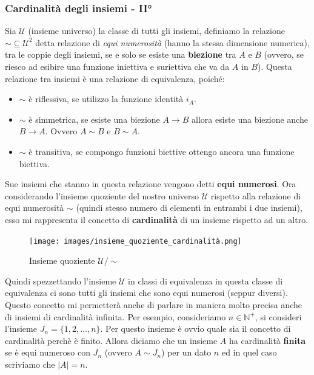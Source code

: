 \documentclass{article}
\begin{document}
\subsubsection{Cardinalità degli insiemi - II°}
Sia $\mathcal{U}$ (insieme universo) la classe di tutti gli insiemi,
definiamo la relazione $\sim\subseteq\mathcal{U}^2$ detta relazione
di \textit{equi numerosità} (hanno la stessa dimensione numerica), tra le coppie degli insiemi, se e solo se esiste
una \textbf{biezione} tra $A$ e $B$ (ovvero, se riesco ad esibire una funzione
iniettiva e suriettiva che va da $A$ in $B$).
Questa relazione tra insiemi è una relazione di equivalenza, poiché:
\begin{itemize}
    \item $\sim$ è riflessiva, se utilizzo la funzione identità $i_A$.
    \item $\sim$ è simmetrica, se esiste una biezione $A\rightarrow B$ allora
          esiste una biezione anche $B\rightarrow A$. Ovvero $A\sim B$ e $B\sim A$.
    \item $\sim$ è transitiva, se compongo funzioni biettive ottengo ancora una
          funzione biettiva.
\end{itemize}

Sue insiemi che stanno in questa relazione vengono detti \textbf{equi numerosi}. Ora
considerando l'insieme quoziente del nostro universo $\mathcal{U}$ rispetto alla
relazione di equi numerosità $\sim$ (quindi stesso numero di elementi in entrambi
i due insiemi), esso mi rappresenta il concetto di \textbf{cardinalità}
di un insieme rispetto ad un altro.
\begin{figure}[H]
    \centering
    \texttt{[image: images/insieme\_quoziente\_cardinalità.png]}
    \caption{Insieme quoziente $\mathcal{U} / \sim$}
\end{figure}
Quindi spezzettando l'insieme $\mathcal{U}$ in classi di equivalenza
in questa classe di equivalenza ci sono tutti gli insiemi
che sono equi numerosi (seppur diversi).
Questo concetto mi permetterà anche di parlare in maniera molto precisa anche di
insiemi di cardinalità infinita.
\newline
\newline
Per esempio, consideriamo $n\in\mathbb{N}^+$, si consideri l'insieme $J_n=\{1,2,...,n\}$. Per questo
insieme è ovvio quale sia il concetto di cardinalità perchè è finito.
Allora diciamo che un insieme $A$ ha cardinalità \textbf{finita} se è equi
numeroso con $J_n$ (ovvero $A\sim J_n$) per un dato $n$ ed in quel caso scriviamo che $|A|=n$.
\end{document}
